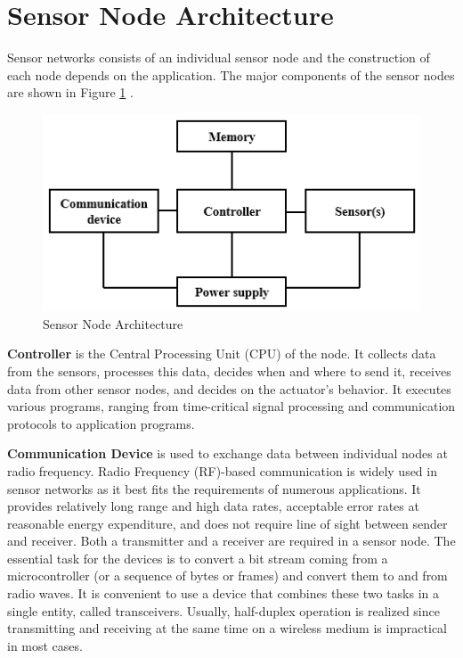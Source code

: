 \section{Sensor Node Architecture}
	Sensor networks consists of an individual sensor node and the construction of each node depends on the application.
	The major components of the sensor nodes are shown in Figure \ref{fig:sensor-node-architecture} \cite{karl2007protocols}.
	\begin{figure}[h!]
		\centering
		\includegraphics[scale = 1]{images/sensor-node-architecture.png}
		\caption{Sensor Node Architecture}
		\label{fig:sensor-node-architecture}
	\end{figure}

	\textbf{Controller} is the Central Processing Unit (CPU) of the node.
	It collects data from the sensors, processes this data, decides when and where to send it, receives data from other sensor nodes, and decides on the actuator’s behavior.
	It executes various programs, ranging from time-critical signal processing and communication protocols to application programs.
	
	\textbf{Communication Device} is used to exchange data between individual nodes at radio frequency.
	Radio Frequency (RF)-based communication is widely used in sensor networks as it best fits the requirements of numerous applications.
	It provides relatively long range and high data rates, acceptable error rates at reasonable energy expenditure, and does not require line of sight between sender and receiver.
	Both a transmitter and a receiver are required in a sensor node. 
	The essential task for the devices is to convert a bit stream coming from a microcontroller (or a sequence of bytes or frames) and convert them to and from radio waves. 
	It is convenient to use a device that combines these two tasks in a single entity, called transceivers. 
	Usually, half-duplex operation is realized since transmitting and receiving at the same time on a wireless medium is impractical in most cases.

